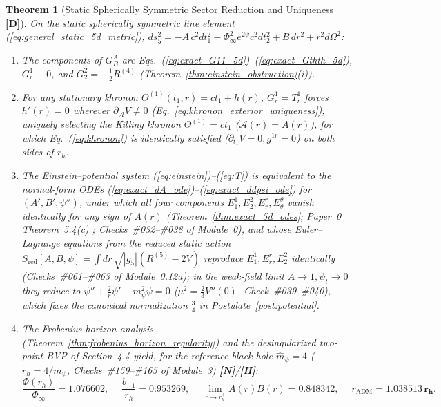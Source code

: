 \documentclass[11pt,a4paper]{article}
\newcommand{\catD}{\textbf{\textcolor{blue!75!black}{[D]}}}
\newcommand{\catH}{\textbf{\textcolor{orange!85!black}{[H]}}}
\newcommand{\catN}{\textbf{\textcolor{teal!75!black}{[N]}}}
\newtheorem{theorem}{Theorem}[section]
\theoremstyle{definition}
\theoremstyle{remark}
\begin{document}
\begin{theorem}[Static Spherically Symmetric Sector Reduction and Uniqueness \catD]
\label{thm:static}
On the static spherically symmetric line element (\ref{eq:general_static_5d_metric}), $ds_5^2 = -A\,c^2 dt_1^2 - \Phi_{\infty}^2 e^{2\psi} c^2 dt_2^2 + B\,dr^2 + r^2 d\Omega^2$:
\begin{enumerate}
  \item[\textnormal{(i)}] The components of $G^A_B$ are Eqs.~(\ref{eq:exact_G11_5d})--(\ref{eq:exact_Gthth_5d}), $G^1_r \equiv 0$, and $G^2_2 = -\frac{1}{2}R^{(4)}$ (Theorem~\ref{thm:einstein_obstruction}(i)).
  \item[\textnormal{(ii)}] For any stationary khronon $\Theta^{(1)}(t_1, r) = ct_1 + h(r)$, $G^1_r = T^1_r$ forces $h'(r) = 0$ wherever $\partial_{\mathcal{A}}V \neq 0$ (Eq.~\ref{eq:khronon_exterior_uniqueness}), uniquely selecting the Killing khronon $\Theta^{(1)} = ct_1$ ($\mathcal{A}(r) = A(r)$), for which Eq.~(\ref{eq:khronon}) is identically satisfied ($\partial_{t_1}V = 0, g^{1r} = 0$) on both sides of $r_h$.
  \item[\textnormal{(iii)}] The Einstein--potential system (\ref{eq:einstein})--(\ref{eq:T}) is equivalent to the normal-form ODEs (\ref{eq:exact_dA_ode})--(\ref{eq:exact_ddpsi_ode}) for $(A', B', \psi'')$, under which all four components $E^1_1, E^2_2, E^r_r, E^{\theta}_{\theta}$ vanish identically for any sign of $A(r)$ (Theorem~\ref{thm:exact_5d_odes}; Paper~0 Theorem~5.4(c) \cite{JV_Paper0}; Checks~\#032--\#038 of Module~0), and whose Euler--Lagrange equations from the reduced static action $S_{\text{red}}[A,B,\psi] = \int dr\,\sqrt{|g_5|}(R^{(5)} - 2V)$ reproduce $E^1_1, E^r_r, E^2_2$ identically (Checks~\#061--\#063 of Module~0.12a); in the weak-field limit $A \to 1, \psi_t \to 0$ they reduce to $\psi'' + \frac{2}{r}\psi' - m_{\psi}^2\psi = 0$ ($\mu^2 = \frac{2}{3}V''(0)$, Check~\#039--\#040), which fixes the canonical normalization $\frac{3}{4}$ in Postulate~\ref{post:potential}.
  \item[\textnormal{(iv)}] The Frobenius horizon analysis (Theorem~\ref{thm:frobenius_horizon_regularity}) and the desingularized two-point BVP of Section~4.4 yield, for the reference black hole $\hat{m}_{\psi} = 4$ ($r_h = 4/m_{\psi}$, Checks~\#159--\#165 of Module~3) \catN/\catH:
  \begin{equation}
    \frac{\Phi(r_h)}{\Phi_{\infty}} = \mathbf{1.076602}, \quad\;
    \frac{b_{-1}}{r_h} = \mathbf{0.953269}, \quad\;
    \lim_{r \to r_h^+} A(r)B(r) = \mathbf{0.848342}, \quad\;
    r_{\text{ADM}} = \mathbf{1.038513\,r_h} .
  \end{equation}
\end{enumerate}
\end{theorem}
\end{document}
